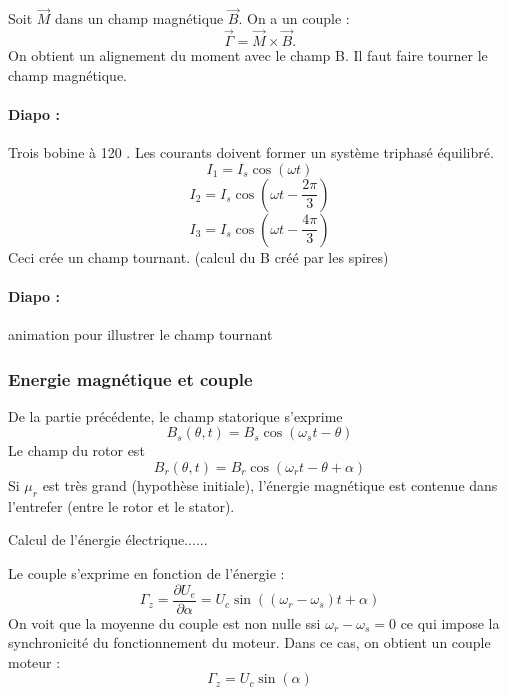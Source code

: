 Soit $\overrightarrow{M}$ dans un champ magnétique $\overrightarrow{B}$.
On a un couple :
\begin{equation}
\overrightarrow{\Gamma} = \overrightarrow{M} \times \overrightarrow{B}.
\end{equation}
On  obtient un alignement du moment avec le champ B.
Il faut faire tourner le champ magnétique.

\paragraph{Diapo : } Trois bobine à 120 \degree.
Les courants doivent former un système triphasé équilibré.
\begin{equation}
I_1 = I_s\cos (\omega t)
\end{equation}
\begin{equation}
I_2 = I_s\cos (\omega t-\frac{2\pi}{3})
\end{equation}
\begin{equation}
I_3 = I_s\cos (\omega t-\frac{4\pi}{3})
\end{equation}
Ceci crée un champ tournant. (calcul du B créé par les spires) 
\paragraph{Diapo : } animation pour illustrer le champ tournant

\subsubsection{Energie magnétique et couple}

De la partie précédente, le champ statorique s'exprime
\begin{equation}
B_s(\theta, t) = B_s\cos(\omega_s t-\theta)
\end{equation}
Le champ du rotor est
\begin{equation}
B_r(\theta, t) = B_r\cos(\omega_r t-\theta+\alpha)
\end{equation}
Si $\mu_r$ est très grand (hypothèse initiale), l'énergie magnétique est contenue dans l'entrefer (entre le rotor et le stator).

Calcul de l'énergie électrique......

Le couple s'exprime en fonction de l'énergie :
\begin{equation}
\Gamma_z = \frac{\partial U_e}{\partial\alpha} = U_c\sin((\omega_r-\omega_s)t+\alpha)
\end{equation}
On voit que la moyenne du couple est non nulle ssi $\omega_r-\omega_s=0$ ce qui impose la synchronicité du fonctionnement du moteur.
Dans ce cas, on obtient un couple moteur :
\begin{equation}
\Gamma_z = U_c\sin(\alpha)
\end{equation}
 

